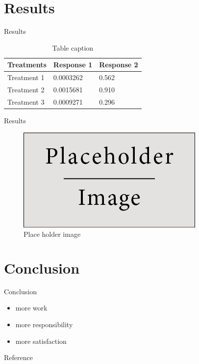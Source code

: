 \documentclass[9pt]{beamer}
\begin{document}
\section{Results}
\begin{frame}{Results}
  \begin{table}
    \begin{tabular}{l l l}
      \toprule
      \textbf{Treatments} & \textbf{Response 1} & \textbf{Response 2}\\
      \midrule
      Treatment 1 & 0.0003262 & 0.562 \\
      Treatment 2 & 0.0015681 & 0.910 \\
      Treatment 3 & 0.0009271 & 0.296 \\
      \bottomrule
    \end{tabular}
    \caption{Table caption}
  \end{table}
\end{frame}

\begin{frame}{Results}
      
  \begin{figure}
      \centering
      \includegraphics[width=.7\textwidth]{placeholder}
      \caption{Place holder image}
  \end{figure}

\end{frame}

\section{Conclusion}
\begin{frame}{Conclusion}
  \begin{itemize}
    \item more work
    \medskip
    \item more responsibility
    \medskip
    \item more satisfaction
  \end{itemize}
    
\end{frame}

\nocite{*}
\begin{frame}[allowframebreaks]{Reference}


\end{frame}
\end{document}
